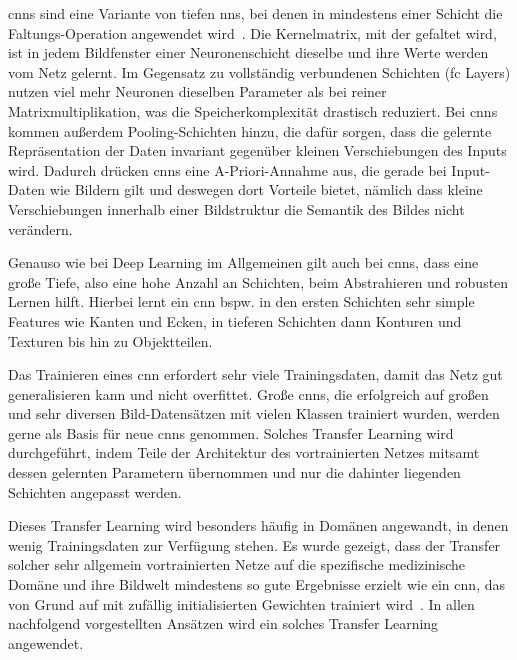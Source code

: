 \glspl{cnn} sind eine Variante von tiefen \glspl{nn}, bei denen in mindestens einer Schicht die Faltungs-Operation angewendet wird~\cite{Goodfellow.2016}.
Die Kernelmatrix, mit der gefaltet wird, ist in jedem Bildfenster einer Neuronenschicht dieselbe und ihre Werte werden vom Netz gelernt.
Im Gegensatz zu vollständig verbundenen Schichten (\gls{fc} Layers) nutzen viel mehr Neuronen dieselben Parameter als bei reiner Matrixmultiplikation, was die Speicherkomplexität drastisch reduziert.
Bei \glspl{cnn} kommen außerdem Pooling-Schichten hinzu, die dafür sorgen, dass die gelernte Repräsentation der Daten invariant gegenüber kleinen Verschiebungen des Inputs wird.
Dadurch drücken \glspl{cnn} eine A-Priori-Annahme aus, die gerade bei Input-Daten wie Bildern gilt und deswegen dort Vorteile bietet, nämlich dass kleine Verschiebungen innerhalb einer Bildstruktur die Semantik des Bildes nicht verändern.

Genauso wie bei Deep Learning im Allgemeinen gilt auch bei \glspl{cnn}, dass eine große Tiefe, also eine hohe Anzahl an Schichten, beim Abstrahieren und robusten Lernen hilft.
Hierbei lernt ein \gls{cnn} bspw. in den ersten Schichten sehr simple Features wie Kanten und Ecken, in tieferen Schichten dann Konturen und Texturen bis hin zu Objektteilen.

Das Trainieren eines \gls{cnn} erfordert sehr viele Trainingsdaten, damit das Netz gut generalisieren kann und nicht overfittet.
Große \glspl{cnn}, die erfolgreich auf großen und sehr diversen Bild-Datensätzen mit vielen Klassen trainiert wurden, werden gerne als Basis für neue \glspl{cnn} genommen.
Solches Transfer Learning wird durchgeführt, indem Teile der Architektur des vortrainierten Netzes mitsamt dessen gelernten Parametern übernommen und nur die dahinter liegenden Schichten angepasst werden.

Dieses Transfer Learning wird besonders häufig in Domänen angewandt, in denen wenig Trainingsdaten zur Verfügung stehen.
Es wurde gezeigt, dass der Transfer solcher sehr allgemein vortrainierten Netze auf die spezifische medizinische Domäne und ihre Bildwelt mindestens so gute Ergebnisse erzielt wie ein \gls{cnn}, das von Grund auf mit zufällig initialisierten Gewichten trainiert wird~\cite{Tajbakhsh.2016}.
In allen nachfolgend vorgestellten Ansätzen wird ein solches Transfer Learning angewendet.


